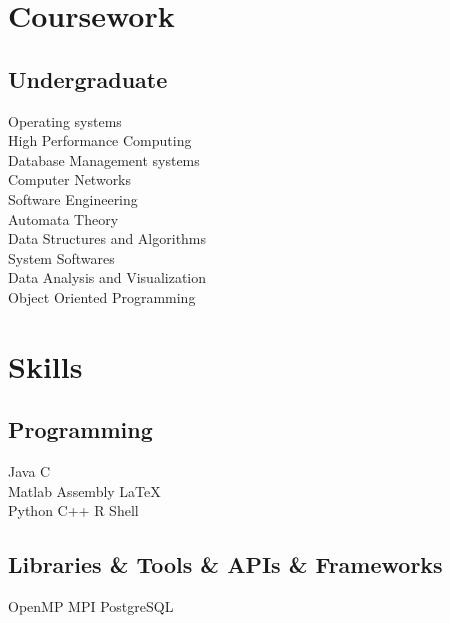 \documentclass[]{deedy-resume-openfont}
\begin{document}
\begin{minipage}[t]{0.33\textwidth}

\section{Coursework}
\subsection{Undergraduate}
Operating systems\\
High Performance Computing\\
Database Management systems\\
Computer Networks\\
Software Engineering\\
Automata Theory\\
Data Structures and Algorithms\\
System Softwares\\
Data Analysis and Visualization\\
Object Oriented Programming\\
\sectionsep


\section{Skills}
\subsection{Programming}
\textbullet{} Java  \textbullet{} C \\
\textbullet{} Matlab \textbullet{} Assembly \textbullet{} \LaTeX{}\\
\textbullet{} Python \textbullet{} C++ \textbullet{} R \textbullet{} Shell
\sectionsep

\subsection{\texorpdfstring{Libraries \& Tools \& \newline APIs \& Frameworks}{}}
\textbullet{} OpenMP \textbullet{} MPI \textbullet{} PostgreSQL
\sectionsep

%
%

\end{minipage} 
\end{document}
